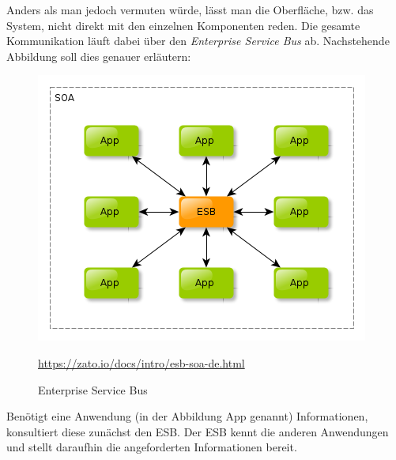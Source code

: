 Anders als man jedoch vermuten würde, lässt man die Oberfläche, bzw. das System, nicht direkt mit den einzelnen Komponenten reden. Die gesamte Kommunikation läuft dabei über den \textit{Enterprise Service Bus} ab. Nachstehende Abbildung soll dies genauer erläutern:

\begin{figure}[htb]
    \centering 
    \includegraphics[width=\linewidth]{content/images/esb-ok}\
    \caption[ESB]{Enterprise Service Bus}
    \quelle\url{https://zato.io/docs/intro/esb-soa-de.html}
    \label{fig:esb}  
\end{figure}
\newpage
Benötigt eine Anwendung (in der Abbildung App genannt) Informationen, konsultiert diese zunächst den ESB. Der ESB kennt die anderen Anwendungen und stellt daraufhin die angeforderten Informationen bereit.